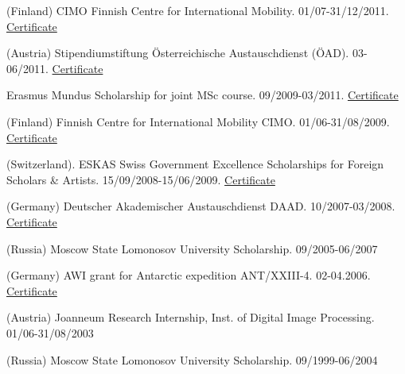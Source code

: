 \documentclass[10pt]{article}
\renewcommand{\section}[2]%
        {\pagebreak[2]\vspace{1.3\baselineskip}%
         \phantomsection\addcontentsline{toc}{section}{#1}%
         \hspace{0in}%
         \marginpar{
         \raggedright \scshape #1}#2}
\begin{document}
\begin{etaremune}[topsep=0pt,itemsep=0pt,partopsep=0pt,parsep=0pt]
	\item (Finland) CIMO Finnish Centre for International Mobility. 01/07-31/12/2011. \href{https://drive.google.com/file/d/1pWlGWLdmyYyx1HV5DP5LhJWrfylhtbAr/view?usp=share_link}{Certificate}
	\item (Austria) Stipendiumstiftung \"{O}sterreichische Austauschdienst (\"{O}AD). 03-06/2011. \href{https://drive.google.com/file/d/1zWEfX5XX82IOrIUYtnzxtjww1IV-BVnt/view?usp=share_link}{Certificate} 
	\item Erasmus Mundus Scholarship for joint MSc course. 09/2009-03/2011. \href{https://drive.google.com/file/d/17fShZifDVw7mDpeUPO_U0GaJcASQMucb/view?usp=share_link}{Certificate}
	\item (Finland) Finnish Centre for International Mobility CIMO. 01/06-31/08/2009. \href{https://drive.google.com/file/d/11kJcqTaDxTjlDKCBwTfwxAC69Mzv5tFm/view?usp=share_link}{Certificate}
	\item (Switzerland). ESKAS Swiss Government Excellence Scholarships for Foreign Scholars \& Artists. 15/09/2008-15/06/2009. \href{https://drive.google.com/file/d/1sgOrMivdNcPP6Y31xGkZFHR9vc3FiluV/view?usp=share_link}{Certificate}
	\item (Germany) Deutscher Akademischer Austauschdienst DAAD. 10/2007-03/2008. \href{https://drive.google.com/file/d/10S5qMTvWl9rNbhz0ZPKIhL-oc5frPsoC/view?usp=share_link}{Certificate}
	\item (Russia) Moscow State Lomonosov University Scholarship. 09/2005-06/2007
	\item (Germany) AWI grant for Antarctic expedition ANT/XXIII-4. 02-04.2006. \href{https://drive.google.com/file/d/1F7qf5_1NM-zUd6DaQyoeorm2k-fI8Klk/view?usp=share_link}{Certificate}
	\item (Austria) Joanneum Research Internship, Inst. of Digital Image Processing. 01/06-31/08/2003
	\item (Russia) Moscow State Lomonosov University Scholarship. 09/1999-06/2004
\end{etaremune}	


\end{document}
